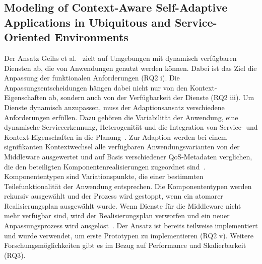 \documentclass[conference,compsoc]{IEEEtran}
\begin{document}
\subsection{Modeling of Context-Aware Self-Adaptive Applications in Ubiquitous and Service-Oriented Environments}
Der Ansatz Geihs et al.~\cite{geihs2009modeling} zielt auf Umgebungen mit dynamisch verfügbaren Diensten ab, die von Anwendungen genutzt werden können. Dabei ist das Ziel die Anpassung der funktionalen Anforderungen (RQ2 i). Die Anpassungsentscheidungen hängen dabei nicht nur von den Kontext-Eigenschaften ab, sondern auch von der Verfügbarkeit der Dienste (RQ2 iii). Um Dienste dynamisch anzupassen, muss der Adaptionsansatz verschiedene Anforderungen erfüllen. Dazu gehören die Variabilität der Anwendung, eine dynamische Serviceerkennung, Heterogenität und die Integration von Service- und Kontext-Eigenschaften in die Planung~\cite{geihs2009modeling}.
Zur Adaption werden bei einem signifikanten Kontextwechsel alle verfügbaren Anwendungsvarianten von der Middleware ausgewertet und auf Basis verschiedener QoS-Metadaten verglichen, die den beteiligten Komponentenrealisierungen zugeordnet sind~\cite{geihs2009modeling}. Komponententypen sind Variationspunkte, die einer bestimmten Teilefunktionalität der Anwendung entsprechen. Die Komponententypen werden rekursiv ausgewählt und der Prozess wird gestoppt, wenn ein atomarer Realisierungsplan ausgewählt wurde.
Wenn Dienste für die Middleware nicht mehr verfügbar sind, wird der Realisierungsplan verworfen und ein neuer Anpassungsprozess wird ausgelöst~\cite{geihs2009modeling}.
Der Ansatz ist bereits teilweise implementiert und wurde verwendet, um erste Prototypen zu implementieren (RQ2 v). Weitere Forschungsmöglichkeiten gibt es im Bezug auf Performance und Skalierbarkeit (RQ3).
\end{document}
